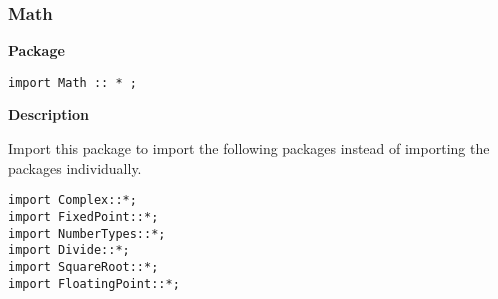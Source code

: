 \subsubsection{Math}
\label{sec-Math}

{\bf Package}

\begin{verbatim}
import Math :: * ;
\end{verbatim}



{\bf Description}

Import this package to import the following packages instead of
importing the packages individually. 

\begin{verbatim}
import Complex::*;
import FixedPoint::*;
import NumberTypes::*;
import Divide::*;
import SquareRoot::*;
import FloatingPoint::*;
\end{verbatim}
